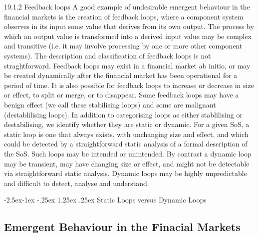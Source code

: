 \documentclass{article}
\makeatletter
\renewcommand\paragraph{\@startsection{paragraph}{4}{\z@}%
	{-2.5ex\@plus -1ex \@minus -.25ex}%
	{1.25ex \@plus .25ex}%
	{\normalfont\normalsize\bfseries}}
\makeatother
\begin{document}
19.1.2 Feedback loops
A good example of undesirable emergent behaviour in the financial markets is the creation of feedback loops, where a component system observes in its input some value that derives from its own output.  The process by which an output value is transformed into a derived input value may be complex and transitive (i.e. it may involve processing by one or more other component systems).
The description and classification of feedback loops is not straghtforward. Feedback loops may exist in a financial market ab initio, or may be created dynamically after the financial market has been operational for a period of time.  It is also possible for feedback loops to increase or decrease in size or effect, to split or merge, or to disappear.  Some feedback loops may have a benign effect (we call these stabilising loops) and some are malignant (destablilising loops).
In addition to categorising loops as either stablilising or destabilising, we identify whether they are static or dynamic.  For a given SoS, a static loop is one that always exists, with unchanging size and effect, and which could be detected by a straightforward static analysis of a formal description of the SoS.  Such loops may be intended or unintended.  By contrast a dynamic loop may be transient, may have changing size or effect, and might not be detectable via straightforward static analysis.  Dynamic loops may be highly unpredictable and difficult to detect, analyse and understand.

\paragraph{Static Loops versus Dynamic Loops} 

\subsection{Emergent Behaviour in the Finacial Markets}
\end{document}
